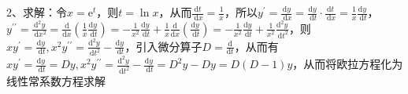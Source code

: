 2、求解：令$x=\mathrm{e}^{t}$，则$t=\ln x$，从而$\frac{\mathrm{d} t}{\mathrm{~d} x}=\frac{1}{x}$，所以$y^{\prime} =\frac{\mathrm{d} y}{\mathrm{~d} x}=\frac{\mathrm{d} y}{\mathrm{~d} t} \cdot \frac{\mathrm{d} t}{\mathrm{~d} x}=\frac{1}{x} \frac{\mathrm{d} y}{\mathrm{~d} t}$，$y^{\prime \prime} =\frac{\mathrm{d}^{2} y}{\mathrm{~d} x^{2}}=\frac{\mathrm{d}}{\mathrm{d} x}\left(\frac{1}{x} \frac{\mathrm{d} y}{\mathrm{~d} t}\right)=-\frac{1}{x^{2}} \frac{\mathrm{d} y}{\mathrm{~d} t}+\frac{1}{x} \frac{\mathrm{d}}{\mathrm{d} x}\left(\frac{\mathrm{d} y}{\mathrm{~d} t}\right) =-\frac{1}{x^{2}} \frac{\mathrm{d} y}{\mathrm{~d} t}+\frac{1}{x^{2}} \frac{\mathrm{d}^{2} y}{\mathrm{~d} t^{2}}$，则$x y^{\prime}=\frac{\mathrm{d} y}{\mathrm{~d} t}, x^{2} y^{\prime \prime}=\frac{\mathrm{d}^{2} y}{\mathrm{~d} t^{2}}-\frac{\mathrm{d} y}{\mathrm{~d} t}$，引入微分算子$D=\frac{\mathrm{d}}{\mathrm{d} t}$，从而有$x y^{\prime}=\frac{\mathrm{d} y}{\mathrm{~d} t}=D y, x^{2} y^{\prime \prime}=\frac{\mathrm{d}^{2} y}{\mathrm{~d} t^{2}}-\frac{\mathrm{d} y}{\mathrm{~d} t}=D^{2} y-D y=D(D-1) y$，从而将欧拉方程化为线性常系数方程求解

